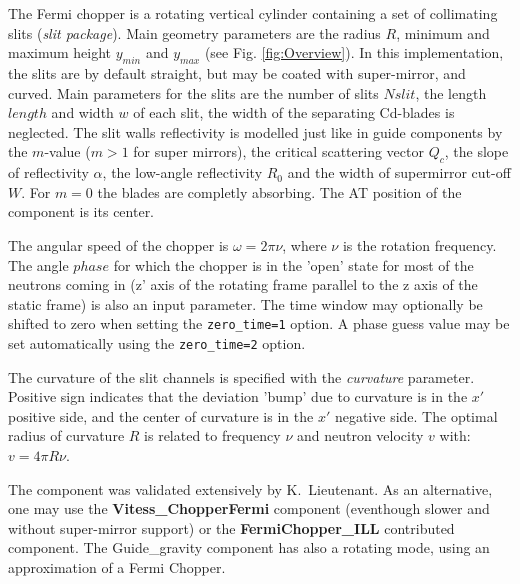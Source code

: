 The Fermi chopper is a rotating vertical cylinder containing a set of collimating slits (\emph{slit package}). Main geometry parameters are the radius $R$, minimum and maximum height $y_{min}$ and $y_{max}$ (see Fig. \ref{fig:Overview}).
In this implementation, the slits are by default straight, but may be coated with super-mirror, and curved. Main parameters for the slits are the number of slits $Nslit$, the length $length$ and width $w$ of each slit, the width of the separating Cd-blades is neglected. The slit walls reflectivity is modelled just like in guide components by the $m$-value ($m > 1$ for super mirrors), the critical scattering vector $Q_c$, the slope of reflectivity $\alpha$, the low-angle reflectivity $R_0$ and the width of supermirror cut-off $W$. For $m=0$ the blades are completly absorbing. The AT position of the component is its center.

The angular speed of the chopper is $\omega = 2\pi \nu$, where $\nu$ is the rotation frequency. The angle $phase$ for which the chopper is in the 'open' state for most of the neutrons coming in (z' axis of the rotating frame parallel to the z axis of the static frame) is also an input parameter. The time window may optionally be shifted to zero when setting the \verb+zero_time=1+ option. A phase guess value may be set automatically using the \verb+zero_time=2+ option.

The curvature of the slit channels is specified with the {\it curvature} parameter. Positive sign indicates that the deviation 'bump' due to curvature is in the $x'$ positive side, and the center of curvature is in the $x'$ negative side. The optimal radius of curvature $R$ is related to frequency $\nu$ and neutron velocity $v$ with: $v=4 \pi R \nu$.

The component was validated extensively by K.\ Lieutenant. As an alternative, one may use the {\bf Vitess\_ChopperFermi} component (eventhough slower and without super-mirror support) or the {\bf FermiChopper\_ILL} contributed component. The Guide\_gravity component has also a rotating mode, using an approximation of a Fermi Chopper.


